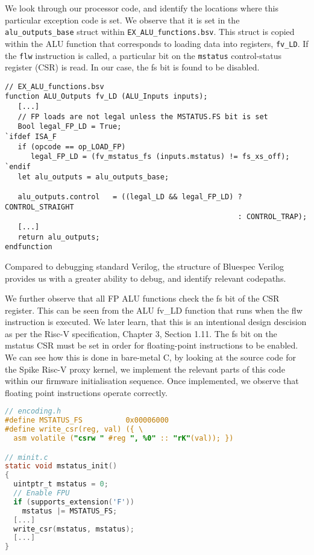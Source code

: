 \documentclass[a4paper,8pt]{report}
\begin{document}
We look through our processor code, and identify the locations where this
particular exception code is set. We observe that it is set in the
\texttt{alu\_outputs\_base} struct within \texttt{EX\_ALU\_functions.bsv}. This
struct is copied within the ALU function that corresponds to loading data into
registers, \texttt{fv\_LD}. If the \texttt{flw} instruction is called, a
particular bit on the \texttt{mstatus} control-status register (CSR) is read. In
our case, the fs bit is found to be disabled.
\begin{verbatim}
// EX_ALU_functions.bsv
function ALU_Outputs fv_LD (ALU_Inputs inputs);
   [...]
   // FP loads are not legal unless the MSTATUS.FS bit is set
   Bool legal_FP_LD = True;
`ifdef ISA_F
   if (opcode == op_LOAD_FP)
      legal_FP_LD = (fv_mstatus_fs (inputs.mstatus) != fs_xs_off);
`endif
   let alu_outputs = alu_outputs_base;

   alu_outputs.control   = ((legal_LD && legal_FP_LD) ? CONTROL_STRAIGHT
                                                      : CONTROL_TRAP);
   [...]
   return alu_outputs;
endfunction
\end{verbatim}

Compared to debugging standard Verilog, the structure of Bluespec Verilog
provides us with a greater ability to debug, and identify relevant codepaths.

We further observe that all FP ALU functions check the fs bit of the CSR register.
This can be seen from the ALU fv\_LD function that runs when the flw instruction
is executed. We later learn, that this is an intentional design descision as per
the Risc-V specification, Chapter 3, Section 1.11. The fs bit on the mstatus CSR must be
set in order for floating-point instructions to be enabled. We can see how this
is done in bare-metal C, by looking at the source code for the Spike Risc-V
proxy kernel, we implement the relevant parts of this code within our firmware
initialisation sequence. Once implemented, we observe that floating point
instructions operate correctly.
\begin{lstlisting}[language=C,style=customc]
// encoding.h
#define MSTATUS_FS          0x00006000
#define write_csr(reg, val) ({ \
  asm volatile ("csrw " #reg ", %0" :: "rK"(val)); })

// minit.c
static void mstatus_init()
{
  uintptr_t mstatus = 0;
  // Enable FPU
  if (supports_extension('F'))
    mstatus |= MSTATUS_FS;
  [...]
  write_csr(mstatus, mstatus);
  [...]
}
\end{lstlisting}
\end{document}
